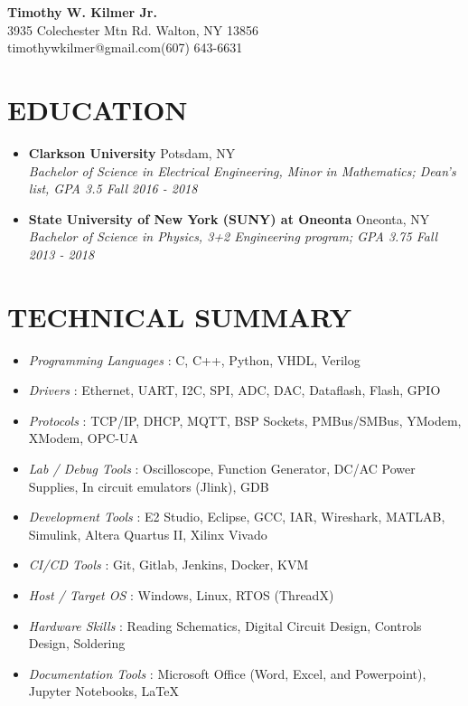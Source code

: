 \documentclass[letterpaper,10pt]{article}
\makeatletter
\def\name{Timothy W. Kilmer Jr.}
\def\email{timothywkilmer@gmail.com}
\def\address{3935 Colechester Mtn Rd. Walton, NY 13856}
\def\phoneNumber{(607) 643-6631}
\newcommand{\resumeSubHeadingListStart}{\begin{itemize}[leftmargin=0.15in, label={}]}
\newcommand{\resumeItemListEnd}{\end{itemize}\vspace{-5pt}}
\newcommand{\skillItem}[2]{\item\textit{#1} : #2\vspace{-5pt}}
\makeatother
\begin{document}
	\begin{center}
		{\LARGE \textbf{\name}} \\ \vspace{2pt}
		{\small \address}\\ 
		{\small \email \space \phoneNumber} \\ \vspace{2pt}		
	\end{center}
	
	\section{EDUCATION}
		\resumeSubHeadingListStart
			\item \textbf{Clarkson University} \hfill Potsdam, NY  \\
			\textit{Bachelor of Science in Electrical Engineering, Minor in Mathematics; Dean’s list, GPA 3.5 \hfill Fall 2016 - 2018}\\
		 	\item \textbf{State University of New York (SUNY) at Oneonta} \hfill Oneonta, NY  \\
		 	\textit{Bachelor of Science in Physics, 3+2 Engineering program; GPA 3.75 \hfill Fall 2013 - 2018}\\
		\resumeItemListEnd

	\section{TECHNICAL SUMMARY}
		\resumeSubHeadingListStart
			\skillItem{Programming Languages}{C, C++, Python, VHDL, Verilog}
			\skillItem{Drivers}{Ethernet, UART, I2C, SPI, ADC, DAC, Dataflash, Flash, GPIO}
			\skillItem{Protocols}{TCP/IP, DHCP, MQTT, BSP Sockets, PMBus/SMBus, YModem, XModem, OPC-UA}
			\skillItem{Lab / Debug Tools}{Oscilloscope, Function Generator, DC/AC Power Supplies, In circuit emulators (Jlink), GDB}
			\skillItem{Development Tools}{E2 Studio, Eclipse, GCC, IAR, Wireshark, MATLAB, Simulink, Altera Quartus II, Xilinx Vivado}
			\skillItem{CI/CD Tools}{Git, Gitlab, Jenkins, Docker, KVM}
			\skillItem{Host / Target OS}{Windows, Linux, RTOS (ThreadX)}
			\skillItem{Hardware Skills}{Reading Schematics, Digital Circuit Design, Controls Design, Soldering}
			\skillItem{Documentation Tools}{Microsoft Office (Word, Excel, and Powerpoint), Jupyter Notebooks, \LaTeX}
		\resumeItemListEnd

\end{document}
